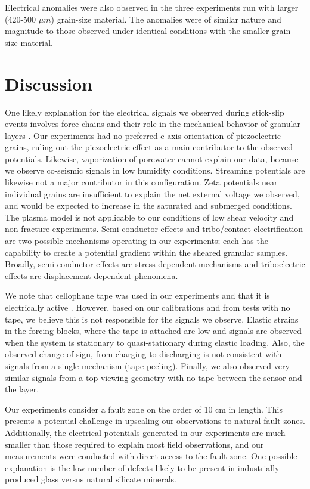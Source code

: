 Electrical anomalies were also observed in the three experiments run with larger (420-500 $\mu m$) grain-size material.  The anomalies were of similar nature and magnitude to those observed under identical conditions with the smaller grain-size material.  

\section{Discussion}

One likely explanation for the electrical signals we observed during stick-slip events involves force chains and their role in the mechanical behavior of granular layers \citep{Majmudar:2005bn}. Our experiments had no preferred c-axis orientation of piezoelectric grains, ruling out the piezoelectric effect as a main contributor to the observed potentials.  Likewise, vaporization of porewater cannot explain our data, because we observe co-seismic signals in low humidity conditions.  Streaming potentials are likewise not a major contributor in this configuration.  Zeta potentials near individual grains are insufficient to explain the net external voltage we observed, and would be expected to increase in the saturated and submerged conditions.  The plasma model is not applicable to our conditions of low shear velocity and non-fracture experiments.  Semi-conductor effects and tribo/contact electrification are two possible mechanisms operating in our experiments; each has the capability to create a potential gradient within the sheared granular samples.  Broadly, semi-conductor effects are stress-dependent mechanisms and triboelectric effects are displacement dependent phenomena.

We note that cellophane tape was used in our experiments and that it is electrically active \citep{Camara:2008ih}. However, based on our calibrations and from tests with no tape, we believe this is not responsible for the signals we observe.  Elastic strains in the forcing blocks, where the tape is attached are low and signals are observed when the system is stationary to quasi-stationary during elastic loading.  Also, the observed change of sign, from charging to discharging is not consistent with signals from a single mechanism (tape peeling).  Finally, we also observed very similar signals from a top-viewing geometry with no tape between the sensor and the layer.

Our experiments consider a fault zone on the order of 10 cm in length. This presents a potential challenge in upscaling our observations to natural fault zones. Additionally, the electrical potentials generated in our experiments are much smaller than those required to explain most field observations, and our measurements were conducted with direct access to the fault zone. One possible explanation is the low number of defects likely to be present in industrially produced glass versus natural silicate minerals. 

